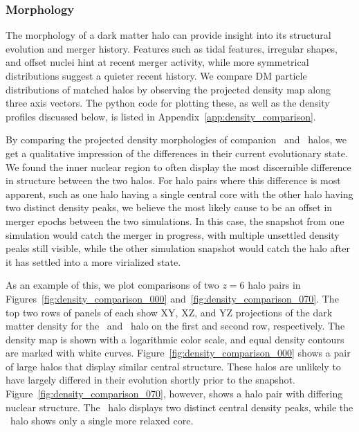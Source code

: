\subsubsection{Morphology}
\label{subsubsec:analysis--halo_comparison--morphology}


The morphology of a dark matter halo can provide insight into its structural evolution and merger history.  Features such as tidal features, irregular shapes, and offset nuclei hint at recent merger activity, while more symmetrical distributions suggest a quieter recent history.  We compare DM particle distributions of matched halos by observing the projected density map along three axis vectors.  The python code for plotting these, as well as the density profiles discussed below, is listed in Appendix~\ref{app:density_comparison}.

By comparing the projected density morphologies of companion \lpt\ and \za\ halos, we get a qualitative impression of the differences in their current evolutionary state.  We found the inner nuclear region to often display the most discernible difference in structure between the two halos.  For halo pairs where this difference is most apparent, such as one halo having a single central core with the other halo having two distinct density peaks, we believe the most likely cause to be an offset in merger epochs between the two simulations.  In this case, the snapshot from one simulation would catch the merger in progress, with multiple unsettled density peaks still visible, while the other simulation snapshot would catch the halo after it has settled into a more virialized state.

As an example of this, we plot comparisons of two $z = 6$ halo pairs in Figures~\ref{fig:density_comparison_000} and~\ref{fig:density_comparison_070}.  The top two rows of panels of each show XY, XZ, and YZ projections of the dark matter density for the \lpt\ and \za\ halo on the first and second row, respectively.  The density map is shown with a logarithmic color scale, and equal density contours are marked with white curves.  Figure~\ref{fig:density_comparison_000} shows a pair of large halos that display similar central structure.  These halos are unlikely to have largely differed in their evolution shortly prior to the snapshot.  Figure~\ref{fig:density_comparison_070}, however, shows a halo pair with differing nuclear structure.  The \za\ halo displays two distinct central density peaks, while the \lpt\ halo shows only a single more relaxed core.

